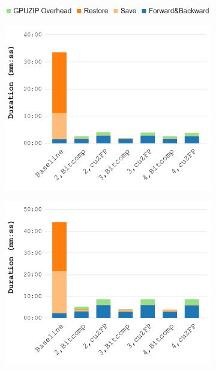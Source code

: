 \documentclass[Ingles,Final]{ic-tese-v3}
\begin{document}
\begin{figure}[h!]
    \centering

    \begin{subfigure}{0.5\textwidth}
        \includegraphics[width=\textwidth]{figures/gpuzip_breakdown/Figure7_legend.png}
        \label{fig:breakdown_legend}
    \end{subfigure}
    \par  %

    \begin{subfigure}{0.48\textwidth}
        \includegraphics[width=\textwidth]{figures/gpuzip_breakdown/Figure7_a.pdf}
        \caption{\revolve}
        \label{fig:breakdown_revolve}
    \end{subfigure}%
    \hfill
    \begin{subfigure}{0.48\textwidth}
        \includegraphics[width=\textwidth]{figures/gpuzip_breakdown/Figure7_b.pdf}
        \caption{\zcut}
        \label{fig:breakdown_zcut}
    \end{subfigure}
    \par\medskip  %


\end{figure}
\end{document}
